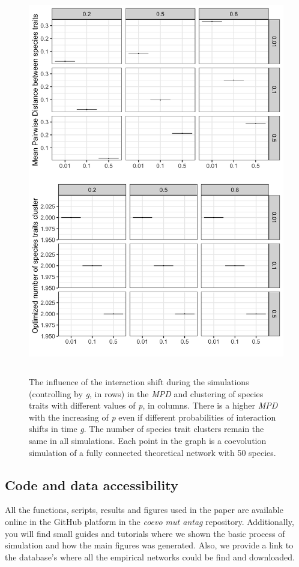 \documentclass[a4paper, 12pt]{article}
\begin{document}
\begin{singlespace}
\begin{figure}[H]
 \centering
  \includegraphics[width = \linewidth, height = 17cm]{Sup_Figura_6.png}
  \vspace*{-7mm}
  \caption{The influence of the interaction shift during the simulations (controlling by \textit{g}, in rows) in the \textit{MPD} and clustering of species traits with different values of \textit{p}, in columns. There is a higher \textit{MPD} with the increasing of \textit{p} even if different probabilities of interaction shifts in time \textit{g}. The number of species trait clusters remain the same in all simulations. Each point in the graph is a coevolution simulation of a fully connected theoretical network with 50 species.}
  \label{supfig:6}
\end{figure}
\end{singlespace}

\newpage
{}
\subsection*{Code and data accessibility}
All the functions, scripts, results and figures used in the paper are available online in the GitHub platform in the \textit{coevo mut antag} repository. Additionally, you will find small guides and tutorials where we shown the basic process of simulation and how the main figures was generated. Also, we provide a link to the database's where all the empirical networks could be find and downloaded.
\end{document}
